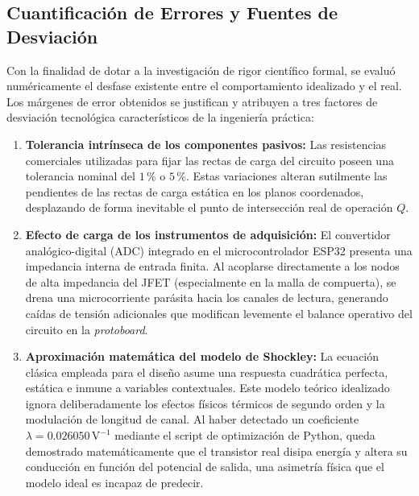 \documentclass[conference]{IEEEtran}
\begin{document}
\subsection{Cuantificación de Errores y Fuentes de Desviación}
Con la finalidad de dotar a la investigación de rigor científico formal, se
evaluó numéricamente el desfase existente entre el comportamiento idealizado y
el real. Los márgenes de error obtenidos se justifican y atribuyen a tres
factores de desviación tecnológica característicos de la ingeniería práctica:
\begin{enumerate}
    \item \textbf{Tolerancia intrínseca de los componentes pasivos:} Las resistencias comerciales utilizadas para fijar las rectas de carga del circuito poseen una tolerancia nominal del $1\,\%$ o $5\,\%$. Estas variaciones alteran sutilmente las pendientes de las rectas de carga estática en los planos coordenados, desplazando de forma inevitable el punto de intersección real de operación $Q$.
    \item \textbf{Efecto de carga de los instrumentos de adquisición:} El convertidor analógico-digital (ADC) integrado en el microcontrolador ESP32 presenta una impedancia interna de entrada finita. Al acoplarse directamente a los nodos de alta impedancia del JFET (especialmente en la malla de compuerta), se drena una microcorriente parásita hacia los canales de lectura, generando caídas de tensión adicionales que modifican levemente el balance operativo del circuito en la \textit{protoboard}.
    \item \textbf{Aproximación matemática del modelo de Shockley:} La ecuación clásica empleada para el diseño asume una respuesta cuadrática perfecta, estática e inmune a variables contextuales. Este modelo teórico idealizado ignora deliberadamente los efectos físicos térmicos de segundo orden y la modulación de longitud de canal. Al haber detectado un coeficiente $\lambda = 0.026050\,\text{V}^{-1}$ mediante el script de optimización de Python, queda demostrado matemáticamente que el transistor real disipa energía y altera su conducción en función del potencial de salida, una asimetría física que el modelo ideal es incapaz de predecir.
\end{enumerate}
\end{document}
